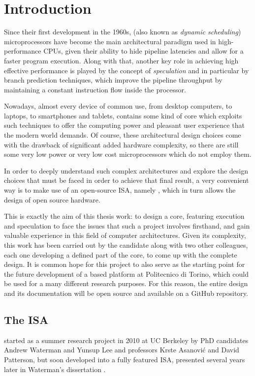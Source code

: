 \chapter{Introduction}
Since their first development in the 1960s, \emph{\ooo} (also known as \emph{dynamic scheduling}) microprocessors have become the main architectural paradigm used in high-performance CPUs, given their ability to hide pipeline latencies and allow for a faster program execution. Along with that, another key role in achieving high effective performance is played by the concept of \emph{speculation} and in particular by branch prediction techniques, which improve the pipeline throughput by maintaining a constant instruction flow inside the processor.

Nowadays, almost every device of common use, from desktop computers, to laptops, to smartphones and tablets, contains some kind of \ooo core which exploits such techniques to offer the computing power and pleasant user experience that the modern world demands. Of course, these architectural design choices come with the drawback of significant added hardware complexity, so there are still some very low power or very low cost microprocessors which do not employ them.

In order to deeply understand such complex architectures and explore the design choices that must be faced in order to achieve that final result, a very convenient way is to make use of an open-source \acf{ISA}, namely \riscv, which in turn allows the design of open source hardware. 

This is exactly the aim of this thesis work: to design a \riscv core, featuring \ooo execution and speculation to face the issues that such a project involves firsthand, and gain valuable experience in this field of computer architectures. Given its complexity, this work has been carried out by the candidate along with two other colleagues, each one developing a defined part of the core, to come up with the complete design. It is common hope for this project to also serve as the starting point for the future development of a \riscv based platform at Politecnico di Torino, which could be used for a many different research purposes. For this reason, the entire design and its documentation will be open source and available on a GitHub repository.

\section{The \riscv ISA}
\riscv started as a summer research project in 2010 at UC Berkeley by PhD candidates Andrew Waterman and Yunsup Lee and professors Krste Asanović and David Patterson, but soon developed into a fully featured \ac{ISA}, presented several years later in Waterman's dissertation \cite{waterman}.

